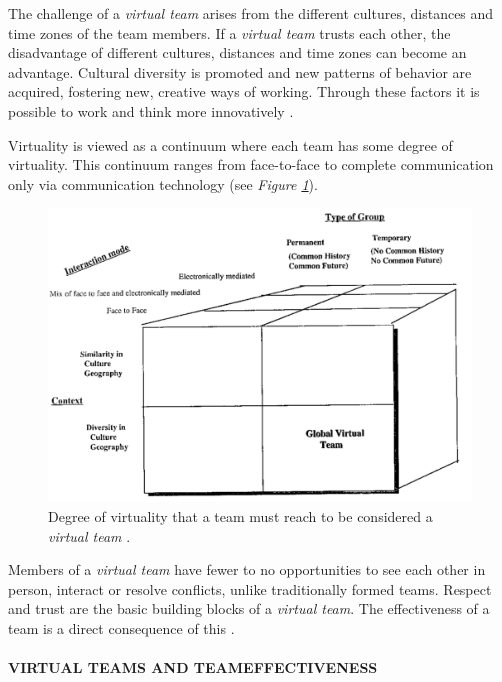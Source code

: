\documentclass[sigchi]{acmart}
\begin{document}
The challenge of a \textit{virtual team} arises from the different cultures, distances and time zones of the team members. If a \textit{virtual team} trusts each other, the disadvantage of different cultures, distances and time zones can become an advantage. Cultural diversity is promoted and new patterns of behavior are acquired, fostering new, creative ways of working. Through these factors it is possible to work and think more innovatively \citep{dyer1995team} \citep[p. 405-416]{milliken1996searching}.

Virtuality is viewed as a continuum where each team has some degree of virtuality. This continuum ranges from face-to-face to complete communication only via communication technology \citep{martins2004virtual} (see \textit{Figure \ref{virtualTeamsVirtuality}}).

\begin{figure}[h]
  \centering
 	\includegraphics[width=\linewidth]{Abbildungen/GlobalVirtualTeam.PNG}	
			\caption[Virtuality of a virtual team]{Degree of virtuality that a team must reach to be considered a \textit{virtual team} \citep{jarvenpaa1999communication}.}
			\label{virtualTeamsVirtuality}
\end{figure}

Members of a \textit{virtual team} have fewer to no opportunities to see each other in person, interact or resolve conflicts, unlike traditionally formed teams. Respect and trust are the basic building blocks of a \textit{virtual team}. The effectiveness of a team is a direct consequence of this \citep[p. 378]{ren2007applying}.

\paragraph{VIRTUAL TEAMS AND TEAMEFFECTIVENESS}
\end{document}
